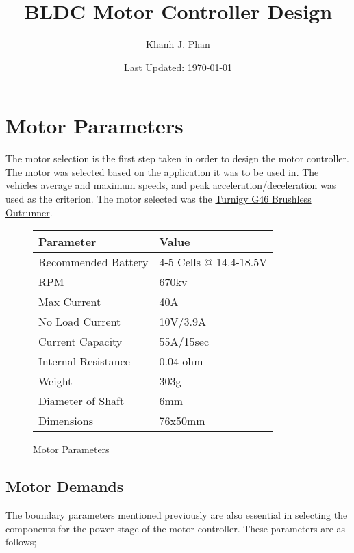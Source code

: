 \documentclass[a4paper]{article}
\title{\Large\textbf{BLDC Motor Controller Design}}
\author{Khanh J. Phan}
\date{Last Updated: \today}
\begin{document}
  \pagestyle{fancy} \lhead{} \rhead{}
  \maketitle
  \tableofcontents

\section{Motor Parameters}
The motor selection is the first step taken in order to design the motor
controller. The motor was selected based on the application it was to be used
in. The vehicles average and maximum speeds, and peak acceleration/deceleration
was used as the criterion.
The motor selected was the \href{http://www.hobbyking.com/hobbyking/store/__14404__Turnigy_G46_Brushless_Outrunner_670kv_46_Glow_.html}{Turnigy
G46 Brushless Outrunner}.

\begin{figure}[h!]
    \centering
    \begin{tabular}{ll}
    \hline
    Parameter & Value \\
    \hline
    Recommended Battery & 4-5 Cells @ 14.4-18.5V\\
    RPM & 670kv\\
    Max Current & 40A\\
    No Load Current & 10V/3.9A\\
    Current Capacity & 55A/15sec\\
    Internal Resistance & 0.04 ohm\\
    Weight & 303g\\
    Diameter of Shaft & 6mm\\
    Dimensions & 76x50mm\\
    \hline
    \end{tabular}
    \caption{Motor Parameters}
\end{figure}

\subsection{Motor Demands}
The boundary parameters mentioned previously are also essential in selecting
the components for the power stage of the motor controller. These parameters are
as follows;
\end{document}

